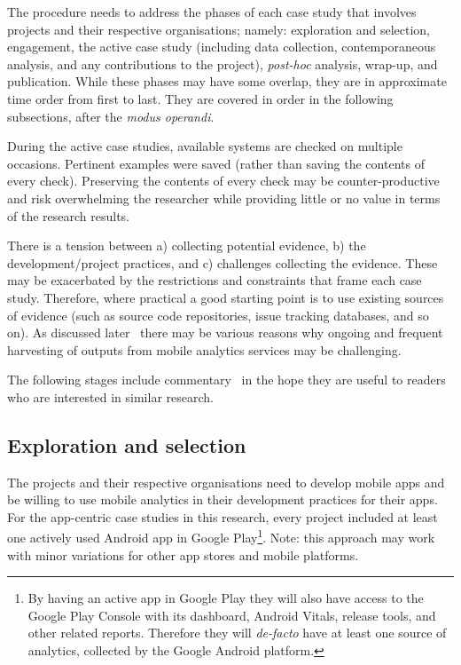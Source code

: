 The procedure needs to address the phases of each case study that involves projects and their respective organisations; namely: exploration and selection, engagement, the active case study (including data collection, contemporaneous analysis, and any contributions to the project), \emph{post-hoc} analysis, wrap-up, and publication. While these phases may have some overlap, they are in approximate time order from first to last. They are covered in order in the following subsections, after the \emph{modus operandi}.



During the active case studies, available systems are checked on multiple occasions. Pertinent examples were saved (rather than saving the contents of every check). Preserving the contents of every check may be counter-productive and risk overwhelming the researcher while providing little or no value in terms of the research results. 

There is a tension between a) collecting potential evidence, b) the development/project practices, and c) challenges collecting the evidence. These may be exacerbated by the restrictions and constraints that frame each case study. Therefore, where practical a good starting point is to use existing sources of evidence (such as source code repositories, issue tracking databases, and so on). As discussed later~ 
there may be various reasons why ongoing and frequent harvesting of outputs from mobile analytics services may be challenging.


The following stages include commentary~ in the hope they are useful to readers who are interested in similar research.

\subsection{Exploration and selection}
The projects and their respective organisations need to develop mobile apps and be willing to use mobile analytics in their development practices for their apps. For the app-centric case studies in this research, every project included at least one actively used Android app in Google Play\footnote{By having an active app in Google Play they will also have access to the Google Play Console with its dashboard, Android Vitals, release tools, and other related reports. Therefore they will \emph{de-facto} have at least one source of analytics, collected by the Google Android platform.}. Note: this approach may work with minor variations for other app stores and mobile platforms.

